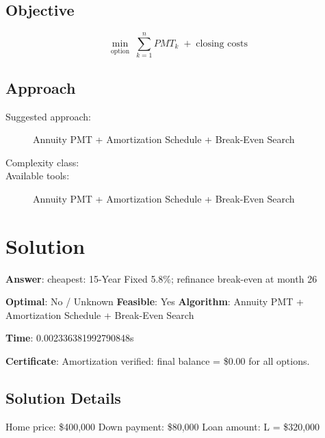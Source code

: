 \documentclass[11pt, a4paper]{article}
\begin{document}
\subsection{Objective}

\begin{equation}
\min_{\text{option}} \; \sum_{k=1}^{n} PMT_k \; + \; \text{closing costs}
\end{equation}

\subsection{Approach}

\begin{description}
  \item[Suggested approach:] Annuity PMT + Amortization Schedule + Break-Even Search
  \item[Complexity class:] 
  \item[Available tools:] Annuity PMT + Amortization Schedule + Break-Even Search
\end{description}
\section{Solution}

\begin{polyaresult}

\textbf{Answer}: cheapest: 15-Year Fixed 5.8\%; refinance break-even at month 26


\textbf{Optimal}: No / Unknown \hfill
\textbf{Feasible}: Yes
\textbf{Algorithm}: Annuity PMT + Amortization Schedule + Break-Even Search \quad $$

\textbf{Time}: 0.002336381992790848s

\textbf{Certificate}: Amortization verified: final balance = \$0.00 for all options.

\end{polyaresult}

\subsection{Solution Details}

Home price: \$400,000
Down payment: \$80,000
Loan amount: L = \$320,000
\end{document}
